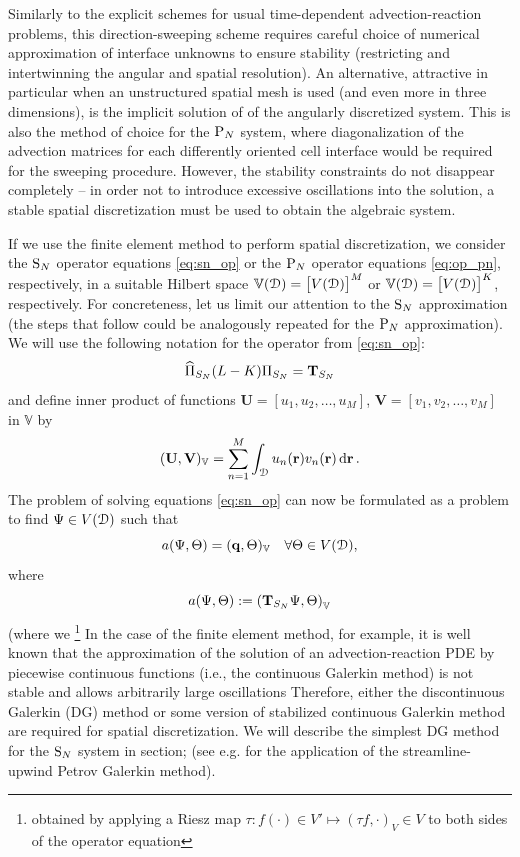 Similarly to the explicit schemes for usual time-dependent advection-reaction problems, this direction-sweeping scheme
requires careful choice of numerical approximation of interface unknowns to ensure stability (restricting and
intertwinning the angular and spatial resolution). An alternative, attractive in particular when an unstructured spatial
mesh is used (and even more in three dimensions), is the implicit solution of of the angularly discretized system. This
is also the method of choice for the $\PN$ system, where diagonalization of the advection matrices for each differently
oriented cell interface would be required for the sweeping procedure. However, the stability constraints do not
disappear completely -- in order not to introduce excessive oscillations into the solution, a stable spatial
discretization must be used to obtain the algebraic system. 

If we use the finite element method to perform spatial discretization, we consider the $\SN$ operator equations 
\eqref{eq:sn_op} or the $\PN$ operator equations \eqref{eq:op_pn}, respectively, in a suitable Hilbert space
$\mathbb{V}(\VV) = \bigl[V(\VV)\bigr]^M$ or $\mathbb{V}(\VV) = \bigl[V(\VV)\bigr]^K$, respectively. For concreteness,
let us limit our attention to the $\SN$ approximation (the steps that follow could be analogously repeated for
the $\PN$ approximation). We will use the following notation for the operator from \eqref{eq:sn_op}:
$$
	\PihSN (L-K) \PiSN = \mat{T}_{S_N}
$$ 
and define inner product of functions $\mathbf{U} = [u_1,u_2,\ldots,u_M]$, $\mathbf{V} = [v_1,v_2,\ldots,v_M]$ in
$\mathbb{V}$ by 
$$
\ip{\mathbb{V}}{\mathbf{U},\mathbf{V}} = \sum_{n=1}^M \int_{\VV} u_n(\br) v_n(\br)\,\d{\br}.
$$
The problem of solving equations \eqref{eq:sn_op} can now be formulated as a problem
to find $\Psi \in V(\VV)$ such that
\begin{equation}\label{eq:weak1}
	a(\Psi,\Theta) = (\mat{q}, \Theta)_\mathbb{V} \quad \forall \Theta\in V(\VV),
\end{equation}
where
$$
	a(\Psi,\Theta) := \left(\mat{T}_{S_N} \Psi, \Theta\right)_\mathbb{V}
$$
(where we  
\footnote{obtained by applying a Riesz map $\tau : f(\cdot)\in V' \mapsto (\tau f,\cdot)_V \in V$ to both sides of the
operator equation} In the case of the finite element method, for
example, it is well known that the approximation of the solution of an advection-reaction PDE by piecewise continuous functions (i.e.,
the continuous Galerkin method) is not stable and allows arbitrarily large oscillations Therefore, either the
discontinuous Galerkin (DG) method or some version of stabilized continuous Galerkin method are required for spatial discretization. We will describe the simplest DG method for the $\SN$ system in \alert{section};
(see e.g. \cite{Meinkohn} for the application of the streamline-upwind Petrov Galerkin method).


